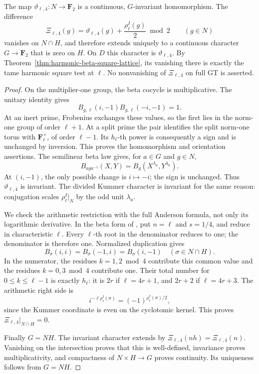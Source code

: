 \begin{proposition}\label{prop:harmonic-finite-relative-character}
The map \(\vartheta_{\ell,4}:N\to\mathbf F_2\) is a continuous,
\(G\)-invariant homomorphism. The difference
\[
 \Xi_{\ell,4}(g)=\vartheta_{\ell,4}(g)
                    +\frac{\rho_\ell^I(g)}2\bmod2
                   \qquad(g\in N)
\]
vanishes on \(N\cap H\), and therefore extends uniquely
to a continuous character \(G\to\mathbf F_2\) that is zero
on \(H\).
On \(D\) this character is \(\vartheta_{\ell,4}\).
By Theorem~\ref{thm:harmonic-beta-square-lattice}, its vanishing
there is exactly the tame harmonic square test at \(\ell\).
No nonvanishing of \(\Xi_{\ell,4}\) on full GT is asserted.
\end{proposition}
\begin{proof}
On the multiplier-one group, the beta cocycle is
multiplicative. The unitary identity gives
\[
 B_{g,\ell}(i,-1)B_{g,\ell}(-i,-1)=1.
\]
At an inert prime, Frobenius exchanges these values, so the
first lies in the norm-one group of order \(\ell+1\).
At a split prime the pair identifies the split norm-one
torus with \(\mathbf F_\ell^\times\), of order \(\ell-1\).
Its \(h_\ell\)-th power is consequently a sign and is
unchanged by inversion. This proves the homomorphism and
orientation assertions.
The semilinear beta law gives, for \(a\in G\) and \(g\in N\),
\[
 B_{aga^{-1}}(X,Y)=B_g(X^{\lambda_a},Y^{\lambda_a}).
\]
At \((i,-1)\), the only possible change is \(i\mapsto-i\);
the sign is unchanged. Thus \(\vartheta_{\ell,4}\) is invariant.
The divided Kummer character is invariant for the same
reason: conjugation scales \(\rho_\ell^I|_N\) by the odd
unit \(\lambda_a\).

We check the arithmetic restriction with the full Anderson
formula, not only its logarithmic derivative. In the beta
form of \cite[Remark~2.4, p.~101]{Furusho2003}, put
\(n=\ell\) and \(s=1/4\), and reduce in characteristic
\(\ell\). Every \(\ell\)-th root in the denominator reduces
to one; the denominator is therefore one.
Normalized duplication gives
\[
 B_\sigma(i,i)=B_\sigma(-1,i)=B_\sigma(i,-1)
                     \quad(\sigma\in N\cap H).
\]
In the numerator, the residues \(k=1,2\bmod4\) contribute
this common value and the residues \(k=0,3\bmod4\)
contribute one. Their total number for
\(0\le k\le\ell-1\) is exactly \(h_\ell\):
it is \(2r\) if \(\ell=4r+1\), and \(2r+2\) if
\(\ell=4r+3\). The arithmetic right side is
\[
 i^{-\ell\rho_\ell^I(\sigma)}
       =(-1)^{\rho_\ell^I(\sigma)/2},
\]
since the Kummer coordinate is even on the cyclotomic
kernel. This proves \(\Xi_{\ell,4}|_{N\cap H}=0\).

Finally \(G=NH\). The invariant character extends by
\(\Xi_{\ell,4}(nh)=\Xi_{\ell,4}(n)\). Vanishing on the intersection
proves that this is well-defined, invariance proves
multiplicativity, and compactness of \(N\times H\to G\)
proves continuity. Its uniqueness follows from \(G=NH\).
\end{proof}

